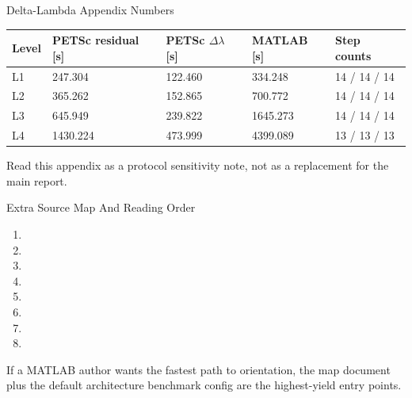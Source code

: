 \documentclass[aspectratio=169,10pt]{beamer}
\begin{document}
\begin{frame}{Delta-Lambda Appendix Numbers}
\small
\begin{tabularx}{\textwidth}{p{}M{0.18\textwidth}M{0.18\textwidth}M{0.16\textwidth}Y}
\toprule
\textbf{Level} & \textbf{PETSc residual [s]} & \textbf{PETSc \(\Delta\lambda\) [s]} & \textbf{MATLAB [s]} & \textbf{Step counts} \\
\midrule
L1 & 247.304 & 122.460 & 334.248 & 14 / 14 / 14 \\
L2 & 365.262 & 152.865 & 700.772 & 14 / 14 / 14 \\
L3 & 645.949 & 239.822 & 1645.273 & 14 / 14 / 14 \\
L4 & 1430.224 & 473.999 & 4399.089 & 13 / 13 / 13 \\
\bottomrule
\end{tabularx}
\vspace{0.18cm}
\begin{softbox}
Read this appendix as a protocol sensitivity note, not as a replacement for the main report.
\end{softbox}
\end{frame}

\begin{frame}{Extra Source Map And Reading Order}
\small
\begin{enumerate}
  \item {}
  \item {}
  \item {}
  \item {}
  \item {}
  \item {}
  \item {}
  \item {}
\end{enumerate}
\vspace{0.18cm}
\begin{callout}
If a MATLAB author wants the fastest path to orientation, the map document plus the default  architecture benchmark config are the highest-yield entry points.
\end{callout}
\end{frame}
\end{document}
